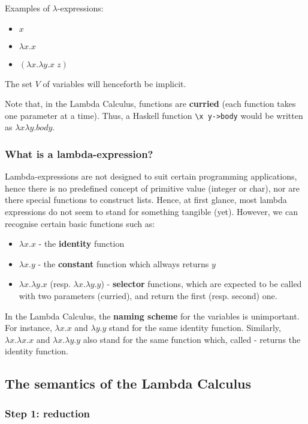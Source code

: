 Examples of $\lambda$-expressions:
\begin{itemize}
	\item  $x$
	\item  $\lambda x.x$
	\item  $(\lambda x.\lambda y.x\;z)$
\end{itemize}

The set $V$ of variables will henceforth be implicit.

Note that, in the Lambda Calculus, functions are \textbf{curried} (each function takes one parameter at a time). Thus, a Haskell function \texttt{\textbackslash x y-\textgreater body} would be written as $\lambda x\lambda y.body$.

\subsubsection*{ What is a lambda-expression? }

Lambda-expressions are not designed to suit certain programming applications, hence there is no predefined concept of primitive value (integer or char), nor are there special functions to construct lists. Hence, at first glance, most lambda expressions do not seem to stand for something tangible (yet). However, we can recognise certain basic functions such as:
\begin{itemize}
	\item  $\lambda x.x$ - the \textbf{identity} function
	\item  $\lambda x.y$ - the \textbf{constant} function which allways returns $y$
	\item  $\lambda x.\lambda y.x$ (resp. $\lambda x.\lambda y.y$) - \textbf{selector} functions, which are expected to be called with two parameters (curried), and return the first (resp. second) one.
\end{itemize}

In the Lambda Calculus, the \textbf{naming scheme} for the variables is unimportant. For instance, $\lambda x.x$ and $\lambda y.y$ stand for the same identity function. Similarly, $\lambda x.\lambda x.x$ and $\lambda x.\lambda y.y$ also stand for the same function which, called - returns the identity function.

\subsection*{ The semantics of the Lambda Calculus }

\subsubsection*{ Step 1: reduction }

